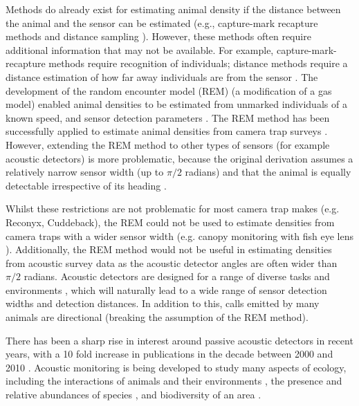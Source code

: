 \documentclass[a4paper,10pt,reqno,oneside]{amsart}
\begin{document}
Methods do already exist for estimating animal density if the distance between the animal and the sensor can be estimated (e.g., capture-mark recapture methods \citep{karanth1995estimating} and distance sampling \citep{harris2013applying}). However, these methods often require additional information that may not be available. For example, capture-mark-recapture methods \citep{karanth1995estimating, trolle2003estimation, soisalo2006estimating, trolle2007camera} require recognition of individuals; distance methods require a distance estimation of how far away individuals are from the sensor \citep{barlow2005estimates, marques2011estimating}. The development of the random encounter model (REM) (a modification of a gas model) enabled animal densities to be estimated from unmarked individuals of a known speed, and sensor detection parameters \citep{rowcliffe2008estimating}. The REM method has been successfully applied to estimate animal densities from camera trap surveys \citep{manzo2012estimation, zero2013monitoring}. However, extending the REM method to other types of sensors (for example acoustic detectors) is more problematic, because the original derivation assumes a relatively narrow sensor width (up to $\pi/2$ radians) and that the animal is equally detectable irrespective of its heading \citep{rowcliffe2008estimating}. 

Whilst these restrictions are not problematic for most camera trap makes (e.g. Reconyx, Cuddeback), the REM could not be used to estimate densities from camera traps with a wider sensor width (e.g. canopy monitoring with fish eye lens \citep{brusa2014increasing}). Additionally, the REM method would not be useful in estimating densities from acoustic survey data as the acoustic detector angles are often wider than $\pi/2$ radians.  Acoustic detectors are designed for a range of diverse tasks and environments \citep{kessel2014review}, which will naturally lead to a wide range of sensor detection widths and detection distances. In addition to this, calls emitted by many animals are directional \citep{blumstein2011acoustic} (breaking the assumption of the REM method). 


There has been a sharp rise in interest around passive acoustic detectors in recent years, with a 10 fold increase in publications in the decade between 2000 and 2010 \citep{kessel2014review}. Acoustic monitoring is being developed to study many aspects of ecology, including the interactions of animals and their environments \citep{blumstein2011acoustic, rogers2013density}, the presence and relative abundances of species \citep{marcoux2011local}, and biodiversity of an area \citep{depraetere2012monitoring}. 
\end{document}
